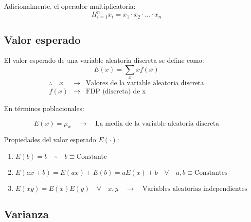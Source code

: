 \documentclass[
]{book}
\providecommand{\tightlist}{%
  \setlength{\itemsep}{0pt}\setlength{\parskip}{0pt}}
\begin{document}
Adicionalmente, el operador multiplicatoria:
\[
\Pi_{i=1}^n x_i = x_1\cdot x_2 \cdot \ldots \cdot x_n
\]

\hypertarget{valor-esperado}{%
\subsection{Valor esperado}\label{valor-esperado}}

El valor esperado de una variable aleatoria discreta se define como:
\[
E(x) = \sum_x xf(x)
\]
\[
\begin{array}{ccc}
\therefore \quad x & \rightarrow & \text{Valores de la variable aleatoria discreta} \\
f(x) & \rightarrow & \text{FDP (discreta) de x}
\end{array}
\]

En términos poblacionales:

\[
E(x) = \mu_x \quad \rightarrow \quad \text{La media de la variable aleatoria discreta}
\]

Propiedades del valor esperado \(E(\cdot)\):

\begin{enumerate}
\def\labelenumi{\arabic{enumi}.}
\tightlist
\item
  \(E(b) = b \quad \therefore \quad b \equiv \text{Constante}\)
\item
  \(E(ax + b) = E(ax) + E(b) = aE(x) + b \quad \forall \quad a,b\equiv \text{Constantes}\)
\item
  \(E(xy) = E(x)E(y) \quad \forall \quad x,y \quad \rightarrow \quad \text{Variables aleatorias independientes}\)
\end{enumerate}

\hypertarget{varianza}{%
\subsection{Varianza}\label{varianza}}

  
\end{document}

